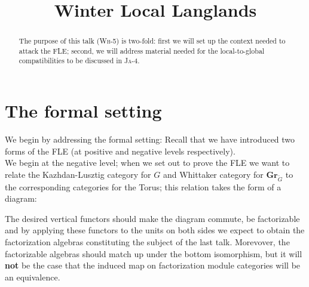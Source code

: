 \documentclass[12pt]{amsart}
\title{Winter Local Langlands \textsc{\Wh{5}}}
\newtheorem{rmk}[thm]{Remark}
\newcommand\Wh[1]{\textsc{Wh}-#1}
\newcommand\Ja[1]{\textsc{Ja}-#1}
\newcommand\Gr{\mathbf{Gr}}
\newcommand\KL{\mathbf{KL}}
\newcommand\Whit{\mathbf{Whit}}
\newcommand\neglv{-\kappa}
\newcommand\dneglv{-\check{\kappa}}
\begin{document}
\begin{abstract}The purpose of this talk (\Wh{5}) is two-fold: first we will set
up the context needed to attack the FLE; second, we will address material needed
for the local-to-global compatibilities to be discussed in \Ja{4}.\end{abstract}

  \maketitle


\section{The formal setting}

  We begin by addressing the formal setting: Recall that we have introduced two
  forms of the FLE (at positive and negative levels
  respectively).\\


  We begin at the negative level\footnotemark; when we set out to prove the FLE
  we want to relate the Kazhdan-Lusztig category for $G$ and Whittaker category
  for $\Gr_{\check{G}}$ to the corresponding categories for the Torus; this
  relation takes the form of a diagram:



  The desired vertical functors should make the diagram commute, be factorizable
  and by applying these functors to the units on both sides we expect to obtain
  the factorization algebras constituting the subject of the last talk.
  Morevover, the factorizable algebras should match up under the bottom
  isomorphism, but it will \textbf{not} be the case that the induced map on
  factorization module categories will be an equivalence.
\end{document}
